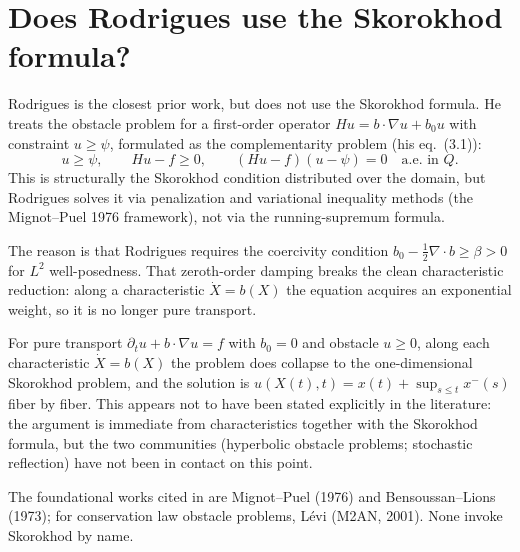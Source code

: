 \documentclass[hidelinks,onefignum,onetabnum,final]{siamart220329}  %
\begin{document}
\section{Does Rodrigues use the Skor\-okhod formula?}

Rodrigues \cite{Rodrigues2004} is the closest prior work, but does not use the Skor\-okhod formula.  He treats the obstacle problem for a first-order operator $Hu = b\cdot\nabla u + b_0 u$ with constraint $u \ge \psi$, formulated as the complementarity problem (his eq.~(3.1)):
\[
u \ge \psi, \qquad Hu - f \ge 0, \qquad (Hu-f)(u-\psi) = 0
\quad \text{a.e.\ in } Q.
\]
This is structurally the Skor\-okhod condition distributed over the domain, but Rodrigues solves it via penalization and variational inequality methods (the Mignot--Puel 1976 framework), not via the running-supremum formula.

The reason is that Rodrigues requires the coercivity condition $b_0 - \tfrac{1}{2}\nabla\cdot b \ge \beta > 0$ for $L^2$ well-posedness.  That zeroth-order damping breaks the clean characteristic reduction: along a characteristic $\dot X = b(X)$ the equation acquires an exponential weight, so it is no longer pure transport.

For pure transport $\partial_t u + b\cdot\nabla u = f$ with $b_0=0$ and obstacle $u \ge 0$, along each characteristic $\dot X = b(X)$ the problem does collapse to the one-dimensional Skor\-okhod problem, and the solution is $u(X(t),t) = x(t) + \sup_{s\le t} x^-(s)$ fiber by fiber.  This appears not to have been stated explicitly in the literature: the argument is immediate from characteristics together with the Skor\-okhod formula, but the two communities (hyperbolic obstacle problems; stochastic reflection) have not been in contact on this point.

The foundational works cited in \cite{Rodrigues2004} are Mignot--Puel
(1976) and Bensoussan--Lions (1973); for conservation law obstacle
problems, L\'evi (M2AN, 2001).  None invoke Skor\-okhod by name.




\end{document}
